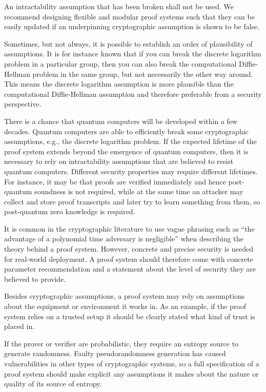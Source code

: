  
An intractability assumption that has been broken shall not be used. 
We recommend designing flexible and modular proof systems such that they can be easily updated if an underpinning cryptographic assumption is shown to be false. 

Sometimes, but not always, it is possible to establish an order of plausibility of assumptions. It is for instance known that if you can break the discrete logarithm problem in a particular group, then you can also break the computational Diffie-Hellman problem in the same group, but not necessarily the other way around. This means the discrete logarithm assumption is more plausible than the computational Diffie-Hellman assumption and therefore preferable from a security perspective.


There is a chance that quantum computers will be developed within a few decades. Quantum computers are able to efficiently break some cryptographic assumptions, e.g., the discrete logarithm problem. If the expected lifetime of the proof system extends beyond the emergence of quantum computers, then it is necessary to rely on intractability assumptions that are believed to resist quantum computers.    	
Different security properties may require different lifetimes. For instance, it may be that proofs are verified immediately and hence post-quantum soundness is not required, while at the same time an attacker may collect and store proof transcripts and later try to learn something from them, so post-quantum zero knowledge is required.


It is common in the cryptographic literature to use vague phrasing such as ``the advantage of a polynomial time adversary is negligible'' when describing the theory behind a proof system. However, concrete and precise security is needed for real-world deployment. A proof system should therefore come with concrete parameter recommendation and a statement about the level of security they are believed to provide.  


Besides cryptographic assumptions, a proof system may rely on assumptions about the equipment or environment it works in.
As an example, if the proof system relies on a trusted setup it should be clearly stated what kind of trust is placed in.


If the prover or verifier are probabilistic, they require an entropy source to generate randomness. 
Faulty pseudorandomness generation has caused vulnerabilities in other types of cryptographic systems, so a full specification of a proof system should make explicit any assumptions it makes about the nature or quality of its source of entropy.

